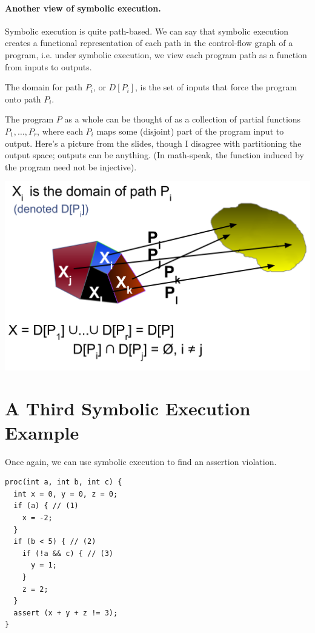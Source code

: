 \documentclass[11pt]{article}
\begin{document}
\paragraph{Another view of symbolic execution.} Symbolic execution is quite path-based. We can say that symbolic execution creates a functional representation of each path
in the control-flow graph of a program, i.e. under symbolic execution, we view each program path as a function from inputs to outputs.

The domain for path $P_i$, or $D[P_i]$, is the set of inputs that force the program onto path $P_i$.

The program $P$ as a whole can be thought of as a collection of partial functions $P_1, \ldots, P_r$, where each $P_i$ maps some (disjoint) part of the program input to output.
Here's a picture from the slides, though I disagree with partitioning the output space; outputs can be anything. (In math-speak, the function induced by the program need not be injective).

\includegraphics[width=.9\textwidth]{L07/partial-function.png}

\section*{A Third Symbolic Execution Example}
Once again, we can use symbolic execution to find an assertion violation.
\begin{lstlisting}
proc(int a, int b, int c) {
  int x = 0, y = 0, z = 0;
  if (a) { // (1)
    x = -2;
  }
  if (b < 5) { // (2)
    if (!a && c) { // (3)
      y = 1;
    }
    z = 2;
  }
  assert (x + y + z != 3);
}
\end{lstlisting}
\end{document}
